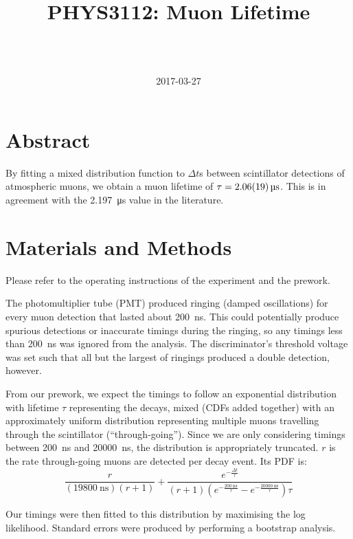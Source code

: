 \documentclass[a4paper]{scrartcl}
\begin{document}
\title{PHYS3112: Muon Lifetime}
\author{ \\ \\ }
\date{2017-03-27}
\maketitle

\section{Abstract}
By fitting a mixed distribution function to \(\Delta t\)s between scintillator detections of atmospheric muons, we obtain a muon lifetime of \(\tau = \SI{2.06 \pm 0.19}{\micro\second}\). This is in agreement with the \SI{2.197}{\micro\second} value in the literature\cite{Olive:2016xmw}.

\section{Materials and Methods}
Please refer to the operating instructions of the experiment and the prework.

The photomultiplier tube (PMT) produced ringing (damped oscillations) for every muon detection that lasted about \SI{200}{\nano\second}. This could potentially produce spurious detections or inaccurate timings during the ringing, so any timings less than \SI{200}{\nano\second} was ignored from the analysis. The discriminator's threshold voltage was set such that all but the largest of ringings produced a double detection, however.

From our prework, we expect the timings to follow an exponential distribution with lifetime \(\tau\) representing the decays, mixed (CDFs added together) with an approximately uniform distribution representing multiple muons travelling through the scintillator (``through-going''). Since we are only considering timings between \SI{200}{\nano\second} and \SI{20000}{\nano\second}, the distribution is appropriately truncated. \(r\) is the rate through-going muons are detected per decay event. Its PDF is:
\[\frac{r}{(\SI{19800}{\nano\second}) (r + 1)} + \frac{e^{-\frac{\Delta t}{\tau}}}{(r + 1) \left(e^{-\frac{\SI{200}{\nano\second}}{\tau}} - e^{-\frac{\SI{20000}{\nano\second}}{\tau}}\right) \tau}\]

Our timings were then fitted to this distribution by maximising the log likelihood\cite{FindDistributionParameters}. Standard errors were produced by performing a bootstrap analysis\cite{bootstrap-analysis}.
\end{document}

